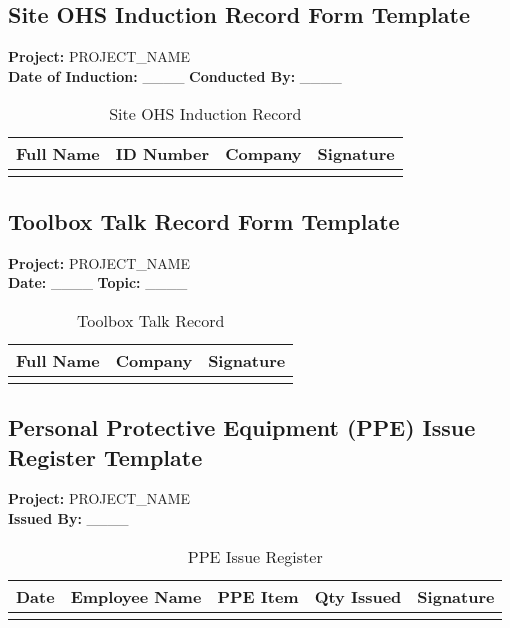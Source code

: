\documentclass[11pt]{article}
\newcommand{\projectName}{{{PROJECT_NAME}}}
\begin{document}
\subsection*{Site OHS Induction Record Form Template}

\textbf{Project:} \projectName \\
\textbf{Date of Induction:} \_\_\_\_ \textbf{Conducted By:} \_\_\_\_

\begin{table}[h]
    \centering
    \begin{tabular}{p{3cm}p{3cm}p{3cm}p{3cm}}
        \toprule
        \textbf{Full Name} & \textbf{ID Number} & \textbf{Company} & \textbf{Signature} \\
        \midrule
        & & & \\
        \bottomrule
    \end{tabular}
    \caption{Site OHS Induction Record}
\end{table}

\subsection*{Toolbox Talk Record Form Template}

\textbf{Project:} \projectName \\
\textbf{Date:} \_\_\_\_ \textbf{Topic:} \_\_\_\_

\begin{table}[h]
    \centering
    \begin{tabular}{p{3cm}p{3cm}p{3cm}}
        \toprule
        \textbf{Full Name} & \textbf{Company} & \textbf{Signature} \\
        \midrule
        & & & \\
        \bottomrule
    \end{tabular}
    \caption{Toolbox Talk Record}
\end{table}

\subsection*{Personal Protective Equipment (PPE) Issue Register Template}

\textbf{Project:} \projectName \\
\textbf{Issued By:} \_\_\_\_

\begin{table}[h]
    \centering
    \begin{tabular}{p{2cm}p{3cm}p{3cm}p{3cm}p{3cm}}
        \toprule
        \textbf{Date} & \textbf{Employee Name} & \textbf{PPE Item} & \textbf{Qty Issued} & \textbf{Signature} \\
        \midrule
        & & & & \\
        \bottomrule
    \end{tabular}
    \caption{PPE Issue Register}
\end{table}
\end{document}
